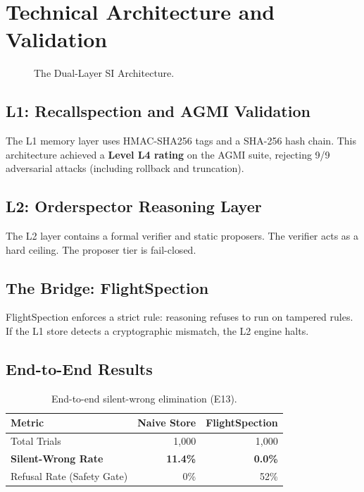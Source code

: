 \documentclass[11pt, a4paper]{article}
\begin{document}
\section{Technical Architecture and Validation}
\begin{figure}[h]
\centering
{}
\caption{The Dual-Layer SI Architecture.}
\end{figure}

\subsection{L1: Recallspection and AGMI Validation}
The L1 memory layer uses HMAC-SHA256 tags and a SHA-256 hash chain. This architecture achieved a \textbf{Level L4 rating} on the AGMI suite, rejecting 9/9 adversarial attacks (including rollback and truncation).

\subsection{L2: Orderspector Reasoning Layer}
The L2 layer contains a formal verifier and static proposers. The verifier acts as a hard ceiling. The proposer tier is fail-closed.

\subsection{The Bridge: FlightSpection}
FlightSpection enforces a strict rule: reasoning refuses to run on tampered rules. If the L1 store detects a cryptographic mismatch, the L2 engine halts.

\subsection{End-to-End Results}
\begin{table}[h]
\centering
\caption{End-to-end silent-wrong elimination (E13).}
\begin{tabular}{@{}lrr@{}}
\toprule
\textbf{Metric} & \textbf{Naive Store} & \textbf{FlightSpection} \\
\midrule
Total Trials & 1,000 & 1,000 \\
\textbf{Silent-Wrong Rate} & \textbf{11.4\%} & \textbf{0.0\%} \\
Refusal Rate (Safety Gate) & 0\% & 52\% \\
\bottomrule
\end{tabular}
\end{table}
\end{document}
